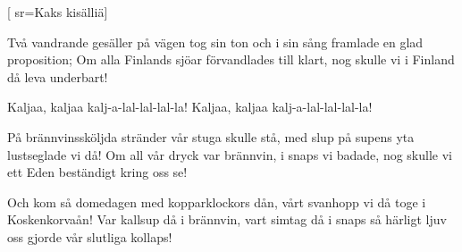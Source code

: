[
	sr={Kaks kisälliä}]

\beginverse*
Två vandrande gesäller
på vägen tog sin ton
och i sin sång framlade
en glad proposition;
Om alla Finlands sjöar
förvandlades till klart,
nog skulle vi i Finland
då leva underbart!
\endverse

\beginchorus
Kaljaa, kaljaa
kalj-a-lal-lal-lal-la!
Kaljaa, kaljaa
kalj-a-lal-lal-lal-la!
\endchorus

\beginverse*
På brännvinssköljda stränder
vår stuga skulle stå,
med slup på supens yta
lustseglade vi då!
Om all vår dryck var brännvin,
i snaps vi badade,
nog skulle vi ett Eden
beständigt kring oss se!
\endverse

\beginverse*
Och kom så domedagen
med kopparklockors dån,
vårt svanhopp vi då toge
i Koskenkorvaån!
Var kallsup då i brännvin,
vart simtag då i snaps
så härligt ljuv oss gjorde
vår slutliga kollaps!
\endverse
\endsong